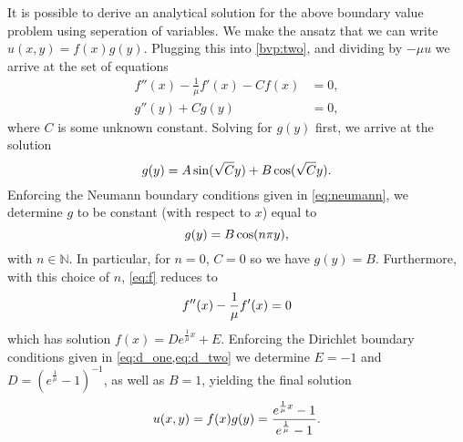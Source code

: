 \documentclass[]{article}
\begin{document}
It is possible to derive an analytical solution for the above boundary value
problem using seperation of variables. We make the ansatz that we can write
$u(x, y) = f(x)g(y)$. Plugging this into \cref{bvp:two}, and dividing by $-\mu
u$ we arrive at the set of equations
\begin{align}
    f''(x) - \frac{1}{\mu}f'(x) - Cf(x) &= 0, \label{eq:f}\\
    g''(y) + Cg(y) &= 0,
\end{align}
where $C$ is some unknown constant. Solving for $g(y)$ first, we arrive at
the solution
\begin{equation}
    \notag
    g(y) = A\sin(\sqrt{C}y) + B\cos(\sqrt{C}y).
\end{equation}
Enforcing the Neumann boundary conditions given in \cref{eq:neumann}, we
determine $g$ to be constant (with respect to $x$) equal to 
\begin{equation}
    \notag
    g(y) = B\cos(n\pi y), 
\end{equation}
with $n \in \mathbb{N}$. In particular, for $n = 0$, $C = 0$ so we have $g(y) = B$. Furthermore, with this choice of $n$, \cref{eq:f} reduces to
\begin{equation}
    \notag
    f''(x) - \frac{1}{\mu}f'(x) = 0
\end{equation}
which has solution $ f(x) = D e^{\frac{1}{\mu}x} + E$.  Enforcing the Dirichlet
boundary conditions given in \cref{eq:d_one,eq:d_two} we determine $E = -1$ and
$D = (e^{\frac{1}{\mu}} - 1)^{-1}$, as well as $B = 1$, yielding the final
solution
\begin{equation}
    \notag
    u(x, y) = f(x)g(y) = \frac{e^{\frac{1}{\mu}x} - 1}{e^{\frac{1}{\mu}} - 1}.
\end{equation}
\end{document}
